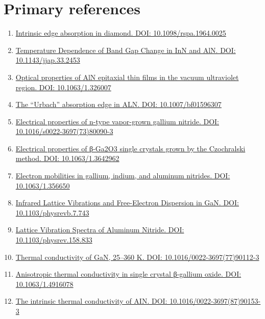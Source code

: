 \documentclass{article}
\begin{document}
\section*{Primary references}
\begin{enumerate}
\item \href{https://doi.org/10.1098/rspa.1964.0025}{Intrinsic edge absorption in diamond. DOI: 10.1098/rspa.1964.0025}
\item \href{https://doi.org/10.1143/jjap.33.2453}{Temperature Dependence of Band Gap Change in InN and AlN. DOI: 10.1143/jjap.33.2453}
\item \href{https://doi.org/10.1063/1.326007}{Optical properties of AlN epitaxial thin films in the vacuum ultraviolet region. DOI: 10.1063/1.326007}
\item \href{https://doi.org/10.1007/bf01596307}{The “Urbach” absorption edge in ALN. DOI: 10.1007/bf01596307}
\item \href{https://doi.org/10.1016/s0022-3697(73)80090-3}{Electrical properties of n-type vapor-grown gallium nitride. DOI: 10.1016/s0022-3697(73)80090-3}
\item \href{https://doi.org/10.1063/1.3642962}{Electrical properties of β-Ga2O3 single crystals grown by the Czochralski method. DOI: 10.1063/1.3642962}
\item \href{https://doi.org/10.1063/1.356650}{Electron mobilities in gallium, indium, and aluminum nitrides. DOI: 10.1063/1.356650}
\item \href{https://doi.org/10.1103/physrevb.7.743}{Infrared Lattice Vibrations and Free-Electron Dispersion in GaN. DOI: 10.1103/physrevb.7.743}
\item \href{https://doi.org/10.1103/physrev.158.833}{Lattice Vibration Spectra of Aluminum Nitride. DOI: 10.1103/physrev.158.833}
\item \href{https://doi.org/10.1016/0022-3697(77)90112-3}{Thermal conductivity of GaN, 25–360 K. DOI: 10.1016/0022-3697(77)90112-3}
\item \href{https://doi.org/10.1063/1.4916078}{Anisotropic thermal conductivity in single crystal β-gallium oxide. DOI: 10.1063/1.4916078}
\item \href{https://doi.org/10.1016/0022-3697(87)90153-3}{The intrinsic thermal conductivity of AIN. DOI: 10.1016/0022-3697(87)90153-3}
\end{enumerate}
\end{document}
